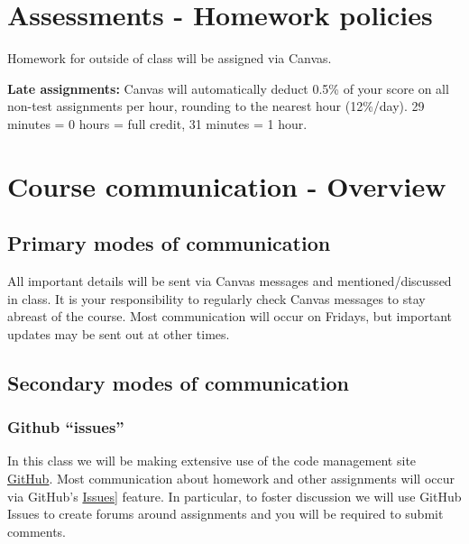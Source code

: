\documentclass[
]{book}
\begin{document}
\hypertarget{homework}{%
\chapter{Assessments - Homework policies}\label{homework}}

Homework for outside of class will be assigned via Canvas.

\textbf{Late assignments:} Canvas will automatically deduct 0.5\% of your score on all non-test assignments per hour, rounding to the nearest hour (12\%/day). 29 minutes = 0 hours = full credit, 31 minutes = 1 hour.

\hypertarget{course-communication---overview}{%
\chapter{Course communication - Overview}\label{course-communication---overview}}

\hypertarget{primary-modes-of-communication}{%
\section{Primary modes of communication}\label{primary-modes-of-communication}}

All important details will be sent via Canvas messages and mentioned/discussed in class. It is your responsibility to regularly check Canvas messages to stay abreast of the course. Most communication will occur on Fridays, but important updates may be sent out at other times.

\hypertarget{secondary-modes-of-communication}{%
\section{Secondary modes of communication}\label{secondary-modes-of-communication}}

\hypertarget{github-issues}{%
\subsection{Github ``issues''}\label{github-issues}}

In this class we will be making extensive use of the code management site \href{https://github.com/}{GitHub}. Most communication about homework and other assignments will occur via GitHub's \href{https://guides.github.com/features/issues/}{Issues}{]} feature. In particular, to foster discussion we will use GitHub Issues to create forums around assignments and you will be required to submit comments.
\end{document}
